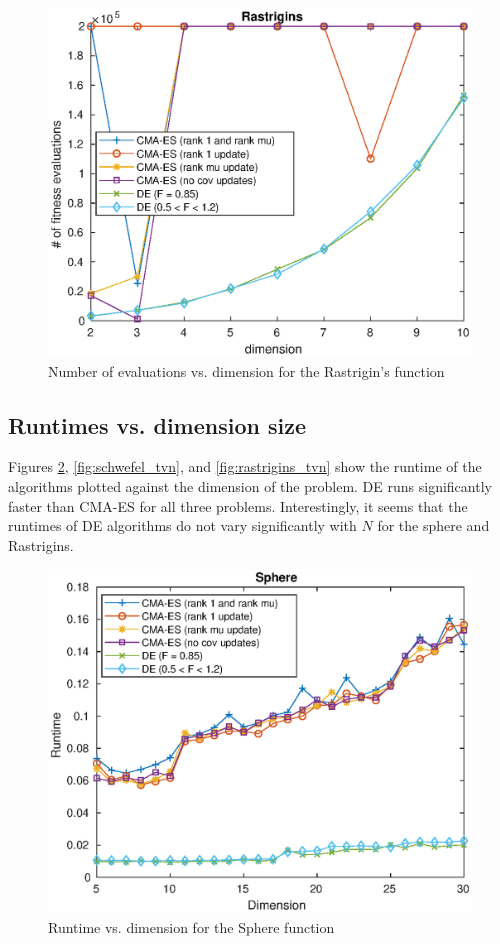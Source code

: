 \documentclass[12pt]{article}
\begin{document}
\begin{figure}[H]
    \centering
    \includegraphics[width=0.75\linewidth]{pics/rastrigins_NvN.eps}
    \caption{Number of evaluations vs. dimension for the Rastrigin's function}
    \label{fig:rastrigins_nvn}
\end{figure}

\subsection{Runtimes vs. dimension size}
Figures \ref{fig:sphere_tvn}, \ref{fig:schwefel_tvn}, and \ref{fig:rastrigins_tvn} show the runtime of the algorithms plotted against the dimension of the problem. DE runs significantly faster than CMA-ES for all three problems. Interestingly, it seems that the runtimes of DE algorithms do not vary significantly with $N$ for the sphere and Rastrigins. 

\begin{figure}[H]
    \centering
    \includegraphics[width=0.8\linewidth]{pics/sphere_TvN.eps}
    \caption{Runtime vs. dimension for the Sphere function}
    \label{fig:sphere_tvn}
\end{figure}
\end{document}
